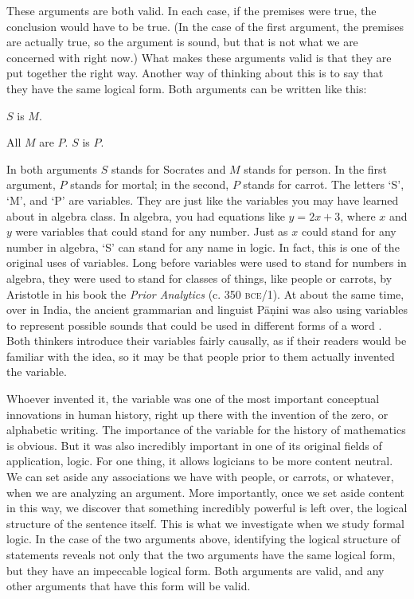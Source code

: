These arguments are both valid. In each case, if the premises were true, the conclusion would have to be true. (In the case of the first argument, the premises are actually true, so the argument is sound, but that is not what we are concerned with right now.) What makes these arguments valid is that they are put together the right way. Another way of thinking about this is to say that they have the same logical form. Both arguments can be written like this:

\begin{earg*}
\item $S$ is $M$.
\item All $M$ are $P$.
\itemc[.2] $S$ is $P$.
\end{earg*}

In both arguments $S$ stands for Socrates and $M$ stands for person. In the first argument, $P$ stands for mortal; in the second, $P$ stands for carrot.  The letters `S', `M', and `P' are variables. They are just like the variables you may have learned about in algebra class. In algebra, you had equations like $y = 2x + 3$, where $x$ and $y$ were variables that could stand for any number. Just as $x$ could stand for any number in algebra, `S' can stand for any name in logic. In fact, this is one of the original uses of variables. Long before variables were used to stand for numbers in algebra, they were used to stand for classes of things, like people or carrots, by Aristotle in his book the \textit{Prior Analytics} (c. 350 \textsc{bce}/1\citeyear{Aristotle1984b}). At about the same time, over in India, the ancient grammarian and linguist P\={a}\d{n}ini was also using variables to represent possible sounds that could be used in different forms of a word \citep{panini2015}. Both thinkers introduce their variables fairly causally, as if their readers would be familiar with the idea, so it may be that people prior to them actually invented the variable.

Whoever invented it, the variable was one of the most important conceptual innovations in human history, right up there with the invention of the zero, or alphabetic writing. The importance of the variable for the history of mathematics is obvious. But it was also incredibly important in one of its original fields of application, logic. For one thing, it allows logicians to be more content neutral. We can set aside any associations we have with people, or carrots, or whatever, when we are analyzing an argument. More importantly, once we set aside content in this way, we discover that something incredibly powerful is left over, the logical structure of the sentence itself. This is what we investigate when we study formal logic. In the case of the two arguments above, identifying the logical structure of statements reveals not only that the two arguments have the same logical form, but they have an impeccable logical form. Both arguments are valid, and any other arguments that have this form will be valid. 

